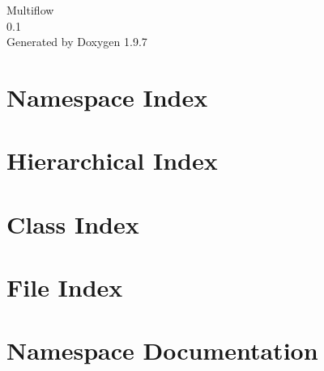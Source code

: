\documentclass[twoside]{book}
\newcommand{\+}{\discretionary{\mbox{\scriptsize$\hookleftarrow$}}{}{}}
\newcommand{\clearemptydoublepage}{%
    \newpage{\pagestyle{empty}\cleardoublepage}%
  }
\begin{document}
  \raggedbottom
    \hypersetup{pageanchor=false,
                bookmarksnumbered=true,
                pdfencoding=unicode
               }
  \begin{titlepage}
  \vspace*{7cm}
  \begin{center}%
  {\Large Multiflow}\\
  [1ex]\large 0.\+1 \\
  \vspace*{1cm}
  {\large Generated by Doxygen 1.9.7}\\
  \end{center}
  \end{titlepage}
  \clearemptydoublepage
  \tableofcontents
  \clearemptydoublepage
  \hypersetup{pageanchor=true}

\chapter{Namespace Index}

\chapter{Hierarchical Index}

\chapter{Class Index}

\chapter{File Index}

\chapter{Namespace Documentation}



\end{document}
